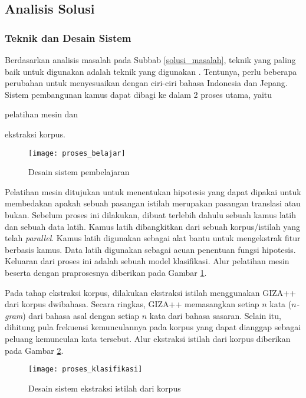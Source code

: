 \documentclass[../main/main.tex]{subfiles}
\begin{document}
\subsection{Analisis Solusi}
\subsubsection{Teknik dan Desain Sistem}
Berdasarkan analisis masalah pada Subbab \ref{solusi_masalah}, teknik yang paling baik untuk digunakan adalah teknik yang digunakan \textcite{aker}. Tentunya, perlu beberapa perubahan untuk menyesuaikan dengan ciri-ciri bahasa Indonesia dan Jepang. Sistem pembangunan kamus dapat dibagi ke dalam 2 proses utama, yaitu
\begin{inparaenum}[(1)]
\item pelatihan mesin dan
\item ekstraksi korpus.
\end{inparaenum}

\begin{figure}[htbp]
	\centering
	\texttt{[image: proses\_belajar]}
	\caption{Desain sistem pembelajaran}
	\label{gbr:solusi_belajar}
\end{figure}

Pelatihan mesin ditujukan untuk menentukan hipotesis yang dapat dipakai untuk membedakan apakah sebuah pasangan istilah merupakan pasangan translasi atau bukan. Sebelum proses ini dilakukan, dibuat terlebih dahulu sebuah kamus latih dan sebuah data latih. Kamus latih dibangkitkan dari sebuah korpus/istilah yang telah \textit{parallel}. Kamus latih digunakan sebagai alat bantu untuk mengekstrak fitur berbasis kamus. Data latih digunakan sebagai acuan penentuan fungsi hipotesis. Keluaran dari proses ini adalah sebuah model klasifikasi. Alur pelatihan mesin beserta dengan praprosesnya diberikan pada Gambar \ref{gbr:solusi_belajar}.

Pada tahap ekstraksi korpus, dilakukan ekstraksi istilah menggunakan GIZA++ dari korpus dwibahasa. Secara ringkas, GIZA++ memasangkan setiap $n$ kata (\textit{$n$-gram}) dari bahasa asal dengan setiap $n$ kata dari bahasa sasaran. Selain itu, dihitung pula frekuensi kemunculannya pada korpus yang dapat dianggap sebagai peluang kemunculan kata tersebut. Alur ekstraksi istilah dari korpus diberikan pada Gambar \ref{gbr:solusi_klasifikasi}.

\begin{figure}[htbp]
	\centering
	\texttt{[image: proses\_klasifikasi]}
	\caption{Desain sistem ekstraksi istilah dari korpus}
	\label{gbr:solusi_klasifikasi}
\end{figure}
\end{document}
